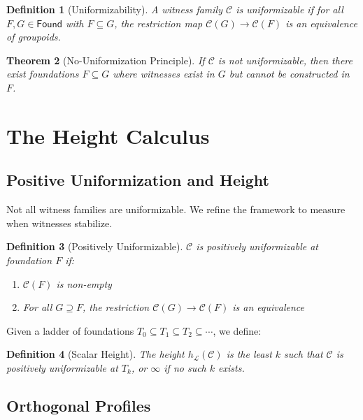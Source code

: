 \documentclass[11pt]{article}
\newtheorem{theorem}{Theorem}[section]
\newtheorem{definition}[theorem]{Definition}
\newcommand{\Found}{\mathsf{Found}}
\begin{document}
\begin{definition}[Uniformizability]
A witness family $\mathcal{C}$ is \emph{uniformizable} if for all $F, G \in \Found$ with $F \subseteq G$, the restriction map $\mathcal{C}(G) \to \mathcal{C}(F)$ is an equivalence of groupoids.
\end{definition}

\begin{theorem}[No-Uniformization Principle]\label{thm:no-unif}
If $\mathcal{C}$ is not uniformizable, then there exist foundations $F \subseteq G$ where witnesses exist in $G$ but cannot be constructed in $F$.
\end{theorem}

\section{The Height Calculus}

\subsection{Positive Uniformization and Height}

Not all witness families are uniformizable. We refine the framework to measure when witnesses stabilize.

\begin{definition}[Positively Uniformizable]
$\mathcal{C}$ is \emph{positively uniformizable} at foundation $F$ if:
\begin{enumerate}
\item $\mathcal{C}(F)$ is non-empty
\item For all $G \supseteq F$, the restriction $\mathcal{C}(G) \to \mathcal{C}(F)$ is an equivalence
\end{enumerate}
\end{definition}

Given a ladder of foundations $T_0 \subseteq T_1 \subseteq T_2 \subseteq \cdots$, we define:

\begin{definition}[Scalar Height]
The \emph{height} $h_{\mathcal{L}}(\mathcal{C})$ is the least $k$ such that $\mathcal{C}$ is positively uniformizable at $T_k$, or $\infty$ if no such $k$ exists.
\end{definition}

\subsection{Orthogonal Profiles}
\end{document}
